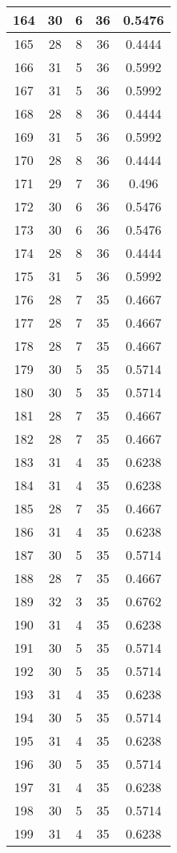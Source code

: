 \documentclass[letterpaper, 12pt]{article}
\begin{document}
\begin{longtable}{|c|c|c|c|c|}
\hline
164 & 30 & 6 & 36 & 0.5476 \\
\hline
165 & 28 & 8 & 36 & 0.4444 \\
\hline
166 & 31 & 5 & 36 & 0.5992 \\
\hline
167 & 31 & 5 & 36 & 0.5992 \\
\hline
168 & 28 & 8 & 36 & 0.4444 \\
\hline
169 & 31 & 5 & 36 & 0.5992 \\
\hline
170 & 28 & 8 & 36 & 0.4444 \\
\hline
171 & 29 & 7 & 36 & 0.496 \\
\hline
172 & 30 & 6 & 36 & 0.5476 \\
\hline
173 & 30 & 6 & 36 & 0.5476 \\
\hline
174 & 28 & 8 & 36 & 0.4444 \\
\hline
175 & 31 & 5 & 36 & 0.5992 \\
\hline
176 & 28 & 7 & 35 & 0.4667 \\
\hline
177 & 28 & 7 & 35 & 0.4667 \\
\hline
178 & 28 & 7 & 35 & 0.4667 \\
\hline
179 & 30 & 5 & 35 & 0.5714 \\
\hline
180 & 30 & 5 & 35 & 0.5714 \\
\hline
181 & 28 & 7 & 35 & 0.4667 \\
\hline
182 & 28 & 7 & 35 & 0.4667 \\
\hline
183 & 31 & 4 & 35 & 0.6238 \\
\hline
184 & 31 & 4 & 35 & 0.6238 \\
\hline
185 & 28 & 7 & 35 & 0.4667 \\
\hline
186 & 31 & 4 & 35 & 0.6238 \\
\hline
187 & 30 & 5 & 35 & 0.5714 \\
\hline
188 & 28 & 7 & 35 & 0.4667 \\
\hline
189 & 32 & 3 & 35 & 0.6762 \\
\hline
190 & 31 & 4 & 35 & 0.6238 \\
\hline
191 & 30 & 5 & 35 & 0.5714 \\
\hline
192 & 30 & 5 & 35 & 0.5714 \\
\hline
193 & 31 & 4 & 35 & 0.6238 \\
\hline
194 & 30 & 5 & 35 & 0.5714 \\
\hline
195 & 31 & 4 & 35 & 0.6238 \\
\hline
196 & 30 & 5 & 35 & 0.5714 \\
\hline
197 & 31 & 4 & 35 & 0.6238 \\
\hline
198 & 30 & 5 & 35 & 0.5714 \\
\hline
199 & 31 & 4 & 35 & 0.6238 \\
\hline
\end{longtable}
\end{document}
